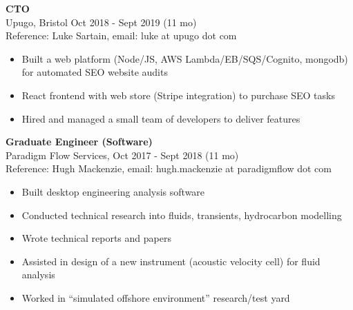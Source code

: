 \documentclass[overlap, line, 10pt]{res} %
\begin{document}
\begin{resume}
\textbf{CTO}\\
Upugo, Bristol Oct 2018 - Sept 2019 (11 mo)\\
Reference: Luke Sartain, email: luke at upugo dot com

\begin{itemize} \itemsep -1pt %
\item Built a web platform (Node/JS, AWS Lambda/EB/SQS/Cognito, mongodb) for automated SEO website audits
\item React frontend with web store (Stripe integration) to purchase SEO tasks
\item Hired and managed a small team of developers to deliver features 

\end{itemize}

\textbf{Graduate Engineer (Software)}\\
Paradigm Flow Services, Oct 2017 - Sept 2018 (11 mo)\\
Reference: Hugh Mackenzie, email: hugh.mackenzie at paradigmflow dot com

\begin{itemize} \itemsep -1pt %
\item Built desktop engineering analysis software
\item Conducted technical research into fluids, transients, hydrocarbon modelling
\item Wrote technical reports and papers
\item Assisted in design of a new instrument (acoustic velocity cell) for fluid analysis
\item Worked in ``simulated offshore environment'' research/test yard
\end{itemize}

\end{resume}
\end{document}
